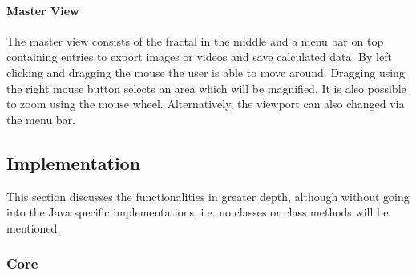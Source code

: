 \documentclass[10pt,a4paper,titlepage]{article}
\begin{document}
	\paragraph{Master View}
	The master view consists of the fractal in the middle and a menu bar on top containing entries to export images or videos and save calculated data. By left clicking and dragging the mouse the user is able to move around. Dragging using the right mouse button selects an area which will be magnified. It is also possible to zoom using the mouse wheel. Alternatively, the viewport can also changed via the menu bar.
	\subsection{Implementation}\label{sec:implementation}
	This section discusses the functionalities in greater depth, although without going into the Java specific implementations, i.e. no classes or class methods will be mentioned.
	\subsubsection{Core}
\end{document}
